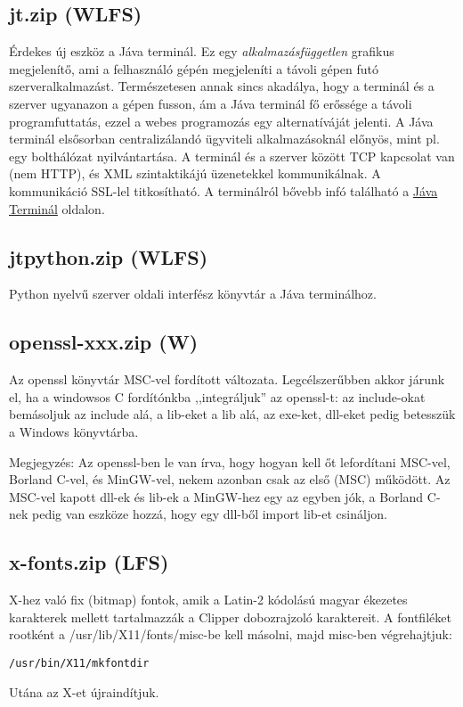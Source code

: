 \subsection{jt.zip (WLFS)}
Érdekes új eszköz a Jáva terminál.
Ez egy {\em alkalmazásfüggetlen} grafikus megjelenítő,
ami a felhasználó gépén megjeleníti a távoli gépen futó 
szerveralkalmazást. Természetesen annak sincs akadálya, hogy a terminál 
és a szerver ugyanazon a gépen fusson, ám a Jáva terminál fő erőssége 
a távoli programfuttatás, ezzel a webes programozás egy alternatíváját 
jelenti. 
A Jáva terminál elsősorban centralizálandó ügyviteli alkalmazásoknál
előnyös, mint pl. egy bolthálózat  nyilvántartása. A terminál és a 
szerver között TCP kapcsolat van (nem HTTP), és XML szintaktikájú 
üzenetekkel kommunikálnak. A kommunikáció SSL-lel titkosítható.
A terminálról bővebb infó található a 
\href{http://ok.comfirm.hu/ccc2/jterminal.html}{Jáva Terminál}
oldalon. 

\subsection{jtpython.zip (WLFS)}
Python nyelvű szerver oldali interfész könyvtár a Jáva terminálhoz.
 
\subsection{openssl-xxx.zip (W)}
Az openssl könyvtár MSC-vel fordított változata.
Legcélszerűbben akkor járunk el, ha a windowsos C fordítónkba
,,integráljuk'' az openssl-t: az include-okat bemásoljuk az include alá,
a lib-eket a lib alá, az exe-ket, dll-eket pedig betesszük a 
Windows könyvtárba. 

Megjegyzés: Az openssl-ben le van írva, hogy hogyan kell őt
lefordítani MSC-vel, Borland C-vel, és MinGW-vel, nekem azonban
csak az első (MSC) működött. Az MSC-vel kapott dll-ek és lib-ek
a MinGW-hez egy az egyben jók, a Borland C-nek pedig van eszköze hozzá,
hogy egy dll-ből import lib-et csináljon.
 

 
\subsection{x-fonts.zip (LFS)}
X-hez való fix (bitmap) fontok, amik a Latin-2 kódolású magyar 
ékezetes karakterek mellett tartalmazzák a Clipper dobozrajzoló karaktereit.
A fontfiléket rootként a /usr/lib/X11/fonts/misc-be kell másolni,
majd misc-ben végrehajtjuk: 
\begin{verbatim}
/usr/bin/X11/mkfontdir
\end{verbatim}
Utána az X-et újraindítjuk.    
 

